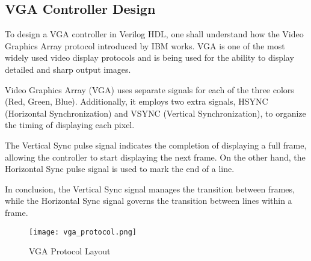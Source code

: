 \subsection{VGA Controller Design}
\par To design a VGA controller in Verilog HDL, one shall understand how the Video Graphics Array protocol introduced by IBM works. VGA is one of the most widely used video display protocols and is being used for the ability to display detailed and sharp output images. \newline
\par Video Graphics Array (VGA) uses separate signals for each of the three colors (Red, Green, Blue). Additionally, it employs two extra signals, HSYNC (Horizontal Synchronization) and VSYNC (Vertical Synchronization), to organize the timing of displaying each pixel. \newline
\par The Vertical Sync pulse signal indicates the completion of displaying a full frame, allowing the controller to start displaying the next frame. On the other hand, the Horizontal Sync pulse signal is used to mark the end of a line. \newline
\par In conclusion, the Vertical Sync signal manages the transition between frames, while the Horizontal Sync signal governs the transition between lines within a frame. \newline

\begin{figure}[H]
    \centering
    \texttt{[image: vga\_protocol.png]}
    \caption{VGA Protocol Layout \cite{fignine}}
    \label{fig:vgaprotocol}  
\end{figure}

